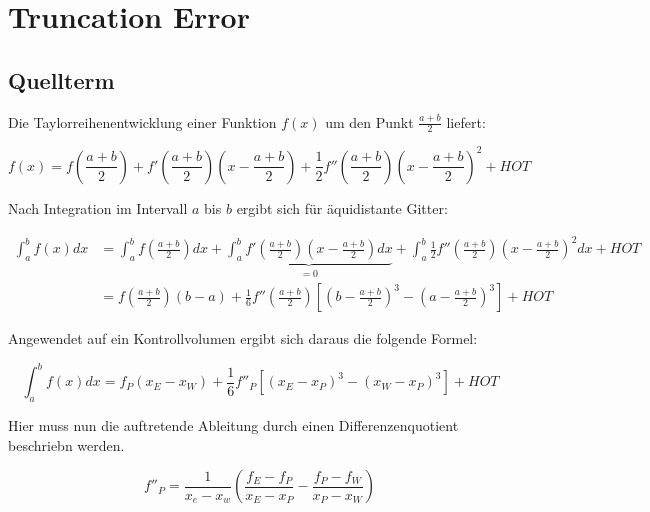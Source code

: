 \documentclass[ngerman,colorback,accentcolor=tud2d]{tudreport}
\begin{document}

\chapter{Truncation Error}
\label{cha:Truncation Error}

\newcommand{\ab}{\frac{a+b}{2}}
\newcommand{\abk}{\left(\frac{a+b}{2}\right)}

\section{Quellterm}
\label{sec:Quellterm}


Die Taylorreihenentwicklung einer Funktion $f(x)$ um den Punkt $\ab$
liefert:

\begin{equation*}
  f(x) = f\abk +
  f'\abk\left(x-\ab\right) +
  \frac{1}{2}f''\abk{\left(x-\ab\right)}^2 + HOT
\end{equation*}

Nach Integration im Intervall $a$ bis $b$ ergibt sich für äquidistante Gitter:

\begin{align*}
  \int_a^b f(x) dx &= \int_a^b f\abk dx +
  \underbrace{\int_a^b f'\abk \left( x - \ab\right) dx}_{=0} +
  \int_a^b \frac{1}{2}f''\abk{\left(x-\ab\right)}^2 dx + HOT\\
  &= f\abk (b-a) + \frac{1}{6} f''\abk
  \left[\left( b-\ab \right)^3 - \left(a-\ab\right)^3 \right] + HOT
\end{align*}

Angewendet auf ein Kontrollvolumen ergibt sich daraus die folgende Formel:

\begin{equation*}
  \int_a^b f(x)dx = f_P(x_E-x_W) + \frac{1}{6} f''_P \left[{{(x_E-x_P)}^3-{(x_W-x_P)}^3}\right] + HOT
\end{equation*}

Hier muss nun die auftretende Ableitung durch einen Differenzenquotient beschriebn werden.

\begin{equation*}
  f''_P = \frac{1}{x_e-x_w}\left(\frac{f_E-f_P}{x_E-x_P}-\frac{f_P-f_W}{x_P-x_W}\right)
\end{equation*}
\end{document}
